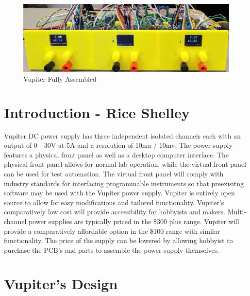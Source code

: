 \documentclass[15pt]{article}
\begin{document}
\begin{figure}[H]
    \begin{center}
      \includegraphics[width=\textwidth]{v}
    \end{center}
    \caption{Vupiter Fully Assembled}
    \label{fig:fullpic}
  \end{figure}
\pagebreak
\begin{singlespace}
    

\tableofcontents
\end{singlespace}
\pagebreak

\section{Introduction - Rice Shelley}
Vupiter DC power supply has three independent isolated channels each with an output of 0 - 30V at 5A and a resolution of 10ma / 10mv. The power supply features a physical front panel as well as a desktop computer interface. The physical front panel allows for normal lab operation, while the virtual front panel can be used for test automation. The virtual front panel will comply with industry standards for interfacing programmable instruments so that preexisitng software may be used with the Vupiter power supply. Vupiter is entirely open source to allow for easy modifications and tailored functionality. Vupiter’s comparatively low cost will provide accessibility for hobbyists and makers. Multi-channel power supplies are typically priced in the \$300 plus range. Vupiter will provide a comparatively affordable option in the 
\$100 range with similar functionality. The price of the supply can be lowered by allowing hobbyist to purchase the PCB’s and parts to assemble the power supply themselves.

\section{Vupiter's Design}
\end{document}

